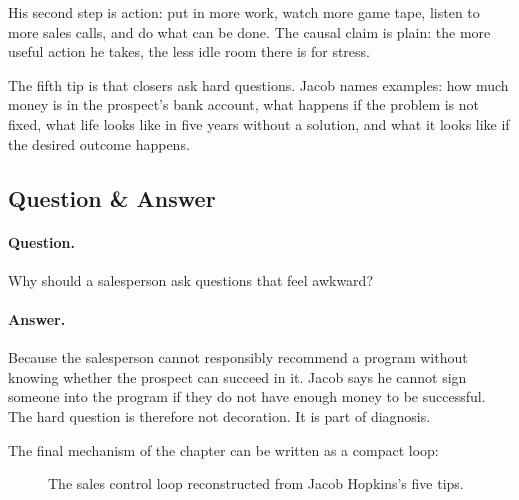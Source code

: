 His second step is action: put in more work, watch more game tape, listen to more sales calls, and do what can be done. The causal claim is plain: the more useful action he takes, the less idle room there is for stress.

The fifth tip is that closers ask hard questions. Jacob names examples: how much money is in the prospect's bank account, what happens if the problem is not fixed, what life looks like in five years without a solution, and what it looks like if the desired outcome happens.

\subsection{Question \& Answer}

\paragraph{Question.}
Why should a salesperson ask questions that feel awkward?

\paragraph{Answer.}
Because the salesperson cannot responsibly recommend a program without knowing whether the prospect can succeed in it. Jacob says he cannot sign someone into the program if they do not have enough money to be successful. The hard question is therefore not decoration. It is part of diagnosis.

The final mechanism of the chapter can be written as a compact loop:

\begin{figure}
\centering
{}
\caption{The sales control loop reconstructed from Jacob Hopkins's five tips.}
\end{figure}

